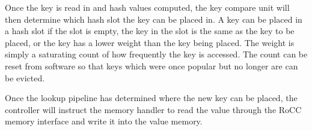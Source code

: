 Once the key is read in and hash values computed, the key compare unit will
then determine which hash slot the key can be placed in. A key can be placed
in a hash slot if the slot is empty, the key in the slot is the same as the
key to be placed, or the key has a lower weight than the key being placed.
The weight is simply a saturating count of how frequently the key is accessed.
The count can be reset from software so that keys which were once popular but
no longer are can be evicted.

Once the lookup pipeline has determined where the new key can be placed, the
controller will instruct the memory handler to read the value through the
RoCC memory interface and write it into the value memory.
